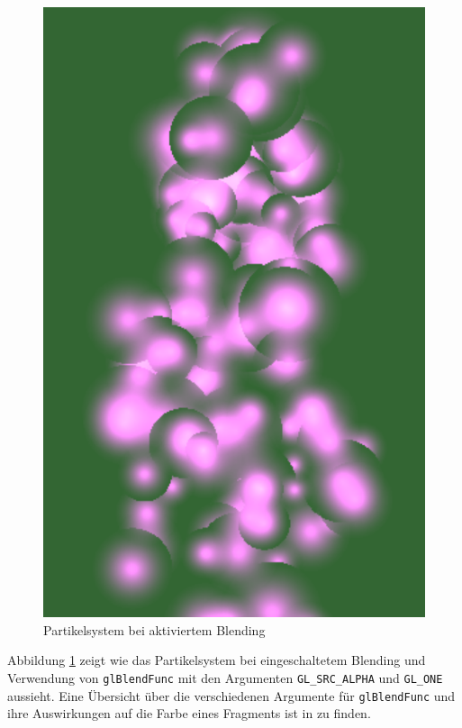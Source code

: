 \begin{figure}[h]
\centering
\includegraphics[scale=0.4]{bilder/BlendingEnabled}
\caption{Partikelsystem bei aktiviertem Blending}
\label{fig:BlendingEnabled}
\end{figure}

Abbildung \ref{fig:BlendingEnabled} zeigt wie das Partikelsystem bei eingeschaltetem Blending und Verwendung von {\texttt{glBlendFunc}} mit den Argumenten {\texttt{GL\_SRC\_ALPHA}} und {\texttt{GL\_ONE}} aussieht. Eine Übersicht über die verschiedenen Argumente für {\texttt{glBlendFunc}} und ihre Auswirkungen auf die Farbe eines Fragments ist in \cite{virag:2012} zu finden.

